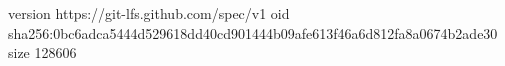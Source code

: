 version https://git-lfs.github.com/spec/v1
oid sha256:0bc6adca5444d529618dd40cd901444b09afe613f46a6d812fa8a0674b2ade30
size 128606
